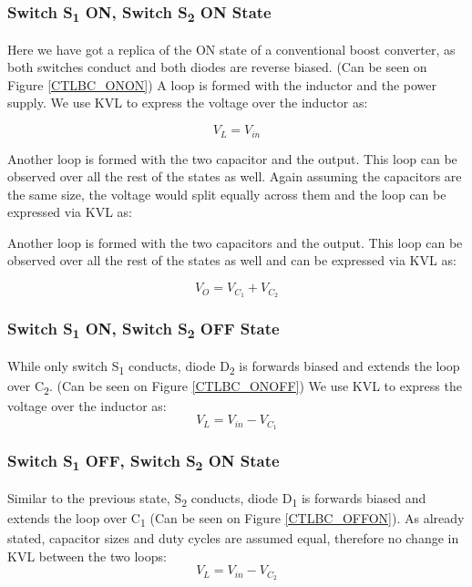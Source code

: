 \subsubsection{Switch S\textsubscript{1} ON, Switch S\textsubscript{2} ON State}
Here we have got a replica of the ON state of a conventional boost converter, as both switches conduct and both diodes are reverse biased. (Can be seen on Figure \ref{CTLBC_ONON}) A loop is formed with the inductor and the power supply. We use KVL to express the voltage over the inductor as: 

\begin{equation}
	V_{L}=V_{in}
	\label{eq:CTLBC_KVL_ONON}
\end{equation}

Another loop is formed with the two capacitor and the output. This loop can be observed over all the rest of the states as well. Again assuming the capacitors are the same size, the voltage would split equally across them and the loop can be expressed via KVL as: 

Another loop is formed with the two capacitors and the output. This loop can be observed over all the rest of the states as well and can be expressed via KVL as: 

\begin{equation}
	V_O=V_{C_1}+V_{C_2}
	\label{eq:CTLBC_KVL_ONON2}
\end{equation}


\subsubsection{Switch S\textsubscript{1} ON, Switch S\textsubscript{2} OFF State}
While only switch S\textsubscript{1} conducts, diode D\textsubscript{2} is forwards biased and extends the loop over C\textsubscript{2}. (Can be seen on Figure \ref{CTLBC_ONOFF}) We use KVL to express the voltage over the inductor as: 
\begin{equation}
	V_{L}=V_{in}-V_{C_1}
	\label{eq:CTLBC_KVL_ONOFF}
\end{equation}
 
\subsubsection{Switch S\textsubscript{1} OFF, Switch S\textsubscript{2} ON State}
Similar to the previous state, S\textsubscript{2} conducts, diode D\textsubscript{1} is forwards biased and extends the loop over C\textsubscript{1} (Can be seen on Figure \ref{CTLBC_OFFON}). As already stated, capacitor sizes and duty cycles are assumed equal, therefore no change in KVL between the two loops: 
\begin{equation}
	V_{L}=V_{in}-V_{C_2}
	\label{eq:CTLBC_KVL_OFFON}
\end{equation}

